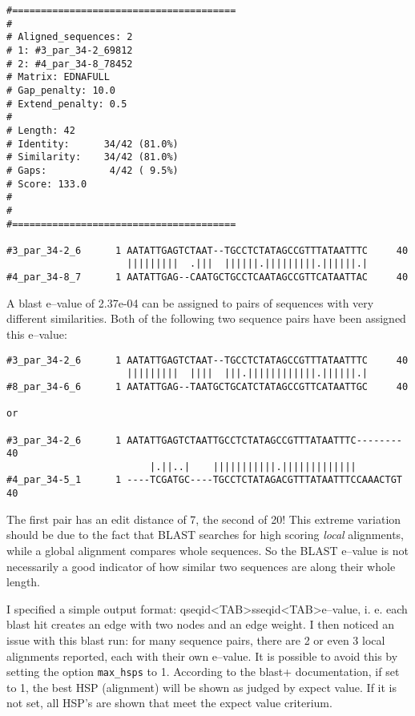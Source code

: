\documentclass{article}\usepackage[]{graphicx}\usepackage[]{color}
\begin{document}
\begin{minipage}[c][21em][c]{\textwidth}
\begin{Verbatim}[fontsize=\scriptsize]
#=======================================
#
# Aligned_sequences: 2
# 1: #3_par_34-2_69812
# 2: #4_par_34-8_78452
# Matrix: EDNAFULL
# Gap_penalty: 10.0
# Extend_penalty: 0.5
#
# Length: 42
# Identity:      34/42 (81.0%)
# Similarity:    34/42 (81.0%)
# Gaps:           4/42 ( 9.5%)
# Score: 133.0
# 
#
#=======================================

#3_par_34-2_6      1 AATATTGAGTCTAAT--TGCCTCTATAGCCGTTTATAATTTC     40
                     |||||||||  .|||  ||||||.|||||||||.||||||.|
#4_par_34-8_7      1 AATATTGAG--CAATGCTGCCTCAATAGCCGTTCATAATTAC     40
\end{Verbatim}
\end{minipage}

A blast e--value of 2.37e-04 can be assigned to pairs of sequences with very different similarities. Both of the following two sequence pairs have been assigned this e--value:

\begin{minipage}[c][11em][c]{\textwidth}
\begin{Verbatim}[fontsize=\scriptsize]
#3_par_34-2_6      1 AATATTGAGTCTAAT--TGCCTCTATAGCCGTTTATAATTTC     40
                     |||||||||  ||||  |||.||||||||||||.||||||.|
#8_par_34-6_6      1 AATATTGAG--TAATGCTGCATCTATAGCCGTTCATAATTGC     40

or

#3_par_34-2_6      1 AATATTGAGTCTAATTGCCTCTATAGCCGTTTATAATTTC--------     40
                         |.||..|    |||||||||||.|||||||||||||        
#4_par_34-5_1      1 ----TCGATGC----TGCCTCTATAGACGTTTATAATTTCCAAACTGT     40
\end{Verbatim}
\end{minipage}

The first pair has an edit distance of 7, the second of 20! This extreme variation should be due to the fact that BLAST searches for high scoring \emph{local} alignments, while a global alignment compares whole sequences. So the BLAST e--value is not necessarily a good indicator of how similar two sequences are along their whole length.

I specified a simple output format: qseqid<TAB>sseqid<TAB>e--value, i. e. each blast hit creates an edge with two nodes and an edge weight. I then noticed an issue with this blast run: for many sequence pairs, there are 2 or even 3 local alignments reported, each with their own e--value. It is possible to avoid this by setting the option \texttt{max\_hsps} to 1. According to the blast+ documentation, if set to 1, the best HSP (alignment) will be shown as judged by expect value. If it is not set, all HSP's are shown that meet the expect value criterium.
\end{document}
